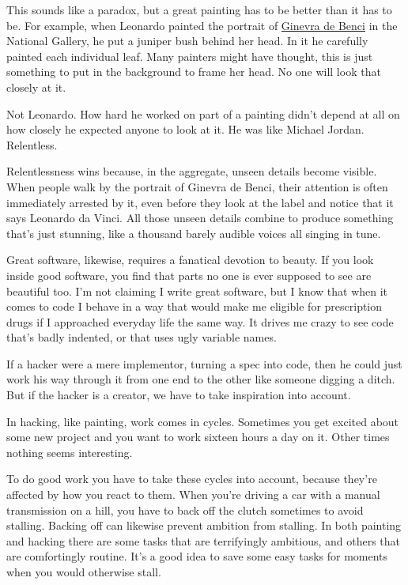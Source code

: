 This sounds like a paradox, but a great painting has to be better than
it has to be. For example, when Leonardo painted the portrait of
\href{ginevra.html}{Ginevra de Benci} in the National Gallery, he put a
juniper bush behind her head. In it he carefully painted each individual
leaf. Many painters might have thought, this is just something to put in
the background to frame her head. No one will look that closely at it.

Not Leonardo. How hard he worked on part of a painting didn't depend at
all on how closely he expected anyone to look at it. He was like Michael
Jordan. Relentless.

Relentlessness wins because, in the aggregate, unseen details become
visible. When people walk by the portrait of Ginevra de Benci, their
attention is often immediately arrested by it, even before they look at
the label and notice that it says Leonardo da Vinci. All those unseen
details combine to produce something that's just stunning, like a
thousand barely audible voices all singing in tune.

Great software, likewise, requires a fanatical devotion to beauty. If
you look inside good software, you find that parts no one is ever
supposed to see are beautiful too. I'm not claiming I write great
software, but I know that when it comes to code I behave in a way that
would make me eligible for prescription drugs if I approached everyday
life the same way. It drives me crazy to see code that's badly indented,
or that uses ugly variable names.

If a hacker were a mere implementor, turning a spec into code, then he
could just work his way through it from one end to the other like
someone digging a ditch. But if the hacker is a creator, we have to take
inspiration into account.

In hacking, like painting, work comes in cycles. Sometimes you get
excited about some new project and you want to work sixteen hours a day
on it. Other times nothing seems interesting.

To do good work you have to take these cycles into account, because
they're affected by how you react to them. When you're driving a car
with a manual transmission on a hill, you have to back off the clutch
sometimes to avoid stalling. Backing off can likewise prevent ambition
from stalling. In both painting and hacking there are some tasks that
are terrifyingly ambitious, and others that are comfortingly routine.
It's a good idea to save some easy tasks for moments when you would
otherwise stall.

